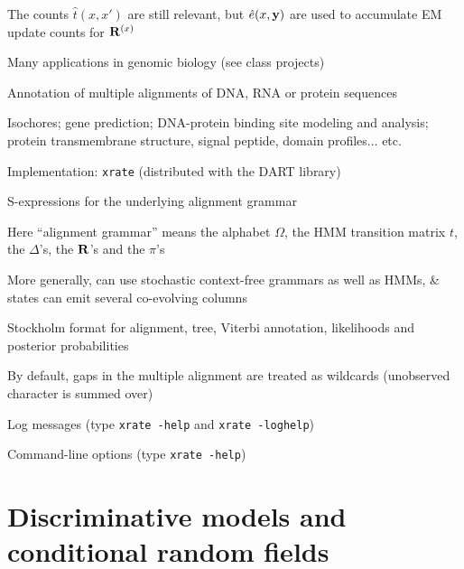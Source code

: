 \documentclass{beamer}
\begin{document}
\begin{frame}{}
 \iteme
\item The counts $\hat{t}(x,x')$ are still relevant, but $\hat{e}(x,{\bf y})$ are used to accumulate EM update counts for ${\bf R}^{(x)}$
\item Many applications in genomic biology (see class projects)
 \itemb
 \item Annotation of multiple alignments of DNA, RNA or protein sequences
 \item Isochores; gene prediction; DNA-protein binding site modeling and analysis; protein transmembrane structure, signal peptide, domain profiles... etc.
 \iteme
\item Implementation: {\tt xrate} (distributed with the DART library)
 \itemb
 \item S-expressions for the underlying alignment grammar
  \itemb
  \item Here ``alignment grammar'' means the alphabet $\Omega$, the HMM transition matrix $t$, the $\Delta$'s, the ${\bf R}$'s and the $\pi$'s
  \item More generally, can use stochastic context-free grammars as well as HMMs, \& states can emit several co-evolving columns
  \iteme
 \item Stockholm format for alignment, tree, Viterbi annotation, likelihoods and posterior probabilities
 \item By default, gaps in the multiple alignment are treated as wildcards (unobserved character is summed over)
 \item Log messages (type {\tt xrate -help} and {\tt xrate -loghelp})
 \item Command-line options (type {\tt xrate -help})
 \iteme
\iteme

\end{frame}

\section{Discriminative models and conditional random fields}
\label{sec:DiscriminativeHMMs}
\end{document}
